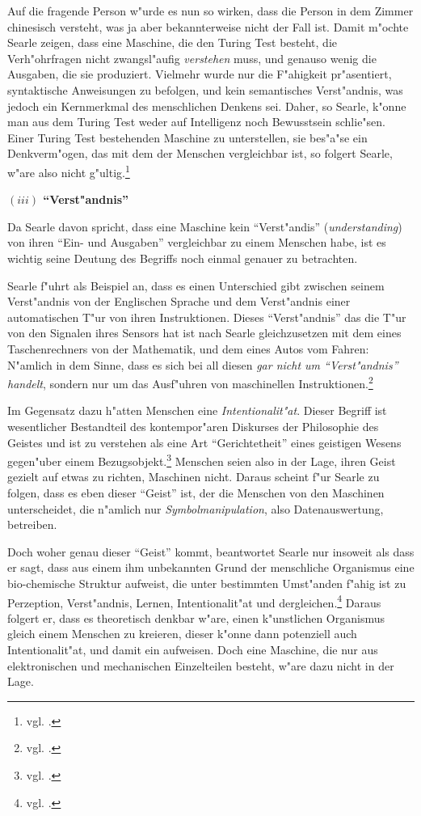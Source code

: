 \documentclass[a4paper, emulatestandardclasses, 12pt]{scrartcl}
\begin{document}
\begin{onehalfspace}
Auf die fragende Person w"urde es nun so wirken, dass die Person in dem Zimmer chinesisch versteht, was ja aber bekannterweise nicht der Fall ist. Damit m"ochte Searle zeigen, dass eine Maschine, die den Turing Test besteht, die Verh"ohrfragen nicht zwangsl"aufig \emph{verstehen} muss, und genauso wenig die Ausgaben, die sie produziert. Vielmehr wurde nur die F"ahigkeit pr"asentiert, syntaktische Anweisungen zu befolgen, und kein semantisches Verst"andnis, was jedoch ein Kernmerkmal des menschlichen Denkens sei. Daher, so Searle, k"onne man aus dem Turing Test weder auf Intelligenz noch Bewusstsein schlie"sen. Einer Turing Test bestehenden Maschine zu unterstellen, sie bes"a"se ein Denkverm"ogen, das mit dem der Menschen vergleichbar ist, so folgert Searle, w"are also nicht g"ultig.\footnote{vgl. \cite[S.????]{searle1980minds}.}

\vspace{5mm}
\noindent\textbf{$(iii)$ "`Verst"andnis"'}

\noindent Da Searle davon spricht, dass eine Maschine kein "`Verst"andis"' (\emph{understanding}) von ihren "`Ein- und Ausgaben"' vergleichbar zu einem Menschen habe, ist es wichtig seine Deutung des Begriffs noch einmal genauer zu betrachten.

Searle f"uhrt als Beispiel an, dass es einen Unterschied gibt zwischen seinem Verst"andnis von der Englischen Sprache und dem Verst"andnis einer automatischen T"ur von ihren Instruktionen. Dieses "`Verst"andnis"' das die T"ur von den Signalen ihres Sensors hat ist nach Searle gleichzusetzen mit dem eines Taschenrechners von der Mathematik, und dem eines Autos vom Fahren: N"amlich in dem Sinne, dass es sich bei all diesen \emph{gar nicht um "`Verst"andnis"' handelt}, sondern nur um das Ausf"uhren von maschinellen Instruktionen.\footnote{vgl. \cite[S.????]{searle1980minds}.}

Im Gegensatz dazu h"atten Menschen eine \emph{Intentionalit"at}. Dieser Begriff ist wesentlicher Bestandteil des kontempor"aren Diskurses der Philosophie des Geistes und ist zu verstehen als eine Art "`Gerichtetheit"' eines geistigen Wesens gegen"uber einem Bezugsobjekt.\footnote{vgl. \cite{sep-intentionality}.} Menschen seien also in der Lage, ihren Geist gezielt auf etwas zu richten, Maschinen nicht. Daraus scheint f"ur Searle zu folgen, dass es eben dieser "`Geist"' ist, der die Menschen von den Maschinen unterscheidet, die n"amlich nur \emph{Symbolmanipulation}, also Datenauswertung, betreiben. 

Doch woher genau dieser "`Geist"' kommt, beantwortet Searle nur insoweit als dass er sagt, dass aus einem ihm unbekannten Grund der menschliche Organismus eine bio-chemische Struktur aufweist, die unter bestimmten Umst"anden f"ahig ist zu Perzeption, Verst"andnis, Lernen, Intentionalit"at und dergleichen.\footnote{vgl. \cite[S.????]{searle1980minds}.} Daraus folgert er, dass es theoretisch denkbar w"are, einen k"unstlichen Organismus gleich einem Menschen zu kreieren, dieser k"onne dann potenziell auch Intentionalit"at, und damit ein  aufweisen. Doch eine Maschine, die nur aus elektronischen und mechanischen Einzelteilen besteht, w"are dazu nicht in der Lage. 


\end{onehalfspace}
\end{document}
